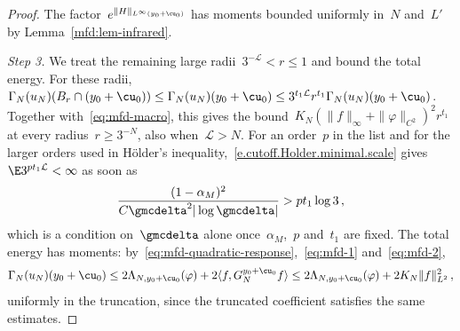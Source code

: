 \documentclass[11pt]{amsart}
\begin{document}
\begin{proof}
\smallskip

The factor~$e^{\|H\|_{L^\infty(y_0+\cu_0)}}$ has moments bounded uniformly in~$N$ and~$L'$ by Lemma~\ref{mfd:lem-infrared}.

\smallskip

\emph{Step 3.} We treat the remaining large radii~$3^{-\mathcal L}<r\leq1$ and bound the total energy. For these radii,~$\Gamma_N(u_N)(B_r\cap(y_0+\cu_0))\leq\Gamma_N(u_N)(y_0+\cu_0)\leq3^{t_1\mathcal L}r^{t_1}\Gamma_N(u_N)(y_0+\cu_0)$. Together with~\eqref{eq:mfd-macro}, this gives the bound~$K_N(\|f\|_\infty+\|\varphi\|_{C^2})^2r^{t_1}$ at every radius~$r\geq3^{-N}$, also when~$\mathcal L>N$. For an order~$p$ in the list and for the larger orders used in H\"older's inequality,~\eqref{e.cutoff.Holder.minimal.scale} gives~$\E3^{pt_1\mathcal L}<\infty$ as soon as
\begin{equation}
	\frac{(1-\alpha_M)^2}{C\gmcdelta^2|\log\gmcdelta|}>pt_1\log3\,,
	\label{eq:mfd-tail-rate}
\end{equation}
which is a condition on~$\gmcdelta$ alone once~$\alpha_M$,~$p$ and~$t_1$ are fixed. The total energy has moments: by~\eqref{eq:mfd-quadratic-response},~\eqref{eq:mfd-1} and~\eqref{eq:mfd-2},
\begin{equation*}
	\Gamma_N(u_N)(y_0+\cu_0)\leq2\Lambda_{N,y_0+\cu_0}(\varphi)+2\langle f,G_N^{y_0+\cu_0}f\rangle\leq2\Lambda_{N,y_0+\cu_0}(\varphi)+2K_N\|f\|_{L^2}^2\,,
\end{equation*}
uniformly in the truncation, since the truncated coefficient satisfies the same estimates.

\smallskip


\end{proof}
\end{document}
